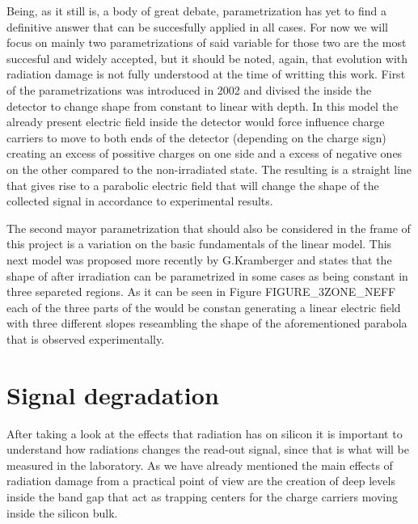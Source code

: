 Being, as it still is, a body of great debate, \neff parametrization has yet to find a definitive answer that can be succesfully applied in all cases. For now we will focus on mainly two parametrizations of said variable for those two are the most succesful and widely accepted, but it should be noted, again, that \neff evolution with radiation damage is not fully understood at the time of writting this work. First of the parametrizations was introduced in 2002 and divised the \neff inside the detector to change shape from constant to linear with depth. In this model the already present electric field inside the detector would force influence charge carriers to move to both ends of the detector (depending on the charge sign) creating an excess of possitive charges on one side and a excess of negative ones on the other compared to the non-irradiated state. The resulting \neff is a straight line that gives rise to a parabolic electric field that will change the shape of the collected signal in accordance to experimental results.

The second mayor parametrization that should also be considered in the frame of this project is a variation on the basic fundamentals of the linear model. This next model was proposed more recently by G.Kramberger and states that the shape of \neff after irradiation can be parametrized in some cases as being constant in three separeted regions. As it can be seen in Figure FIGURE\_3ZONE\_NEFF each of the three parts of the \neff would be constan generating a linear electric field with three different slopes reseambling the shape of the aforementioned parabola that is observed experimentally.


\section{Signal degradation}

After taking a look at the effects that radiation has on silicon it is important to understand how radiations changes the read-out signal, since that is what will be measured in the laboratory. As we have already mentioned the main effects of radiation damage from a practical point of view are the creation of deep levels inside the band gap that act as trapping centers for the charge carriers moving inside the silicon bulk.

